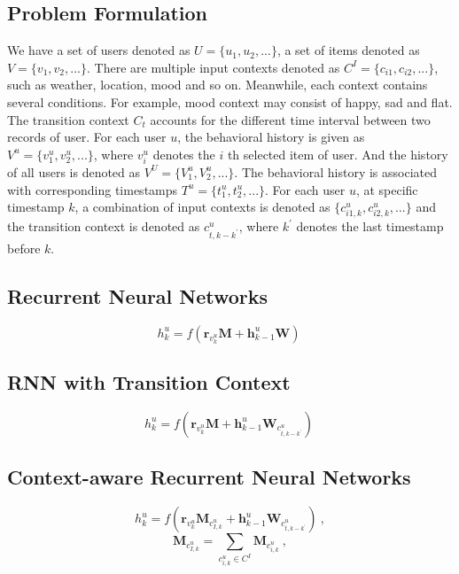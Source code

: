 \documentclass{sig-alternate}
\begin{document}
\subsection{Problem Formulation}
We have a set of users denoted as $U  = \{ u_1 ,u_2 ,...\}$, a set of items denoted as $V  = \{ v_1 ,v_2 ,...\}$. There are multiple input contexts denoted as $C^I = \{c_{i1} ,c_{i2} ,...\}$, such as weather, location, mood and so on. Meanwhile, each context contains several conditions. For example, mood context may consist of happy, sad and flat. The transition context $C_t$ accounts for the different time interval between two records of user. For each user $u$, the behavioral history is given as $V^u = \{v^u_{1}, v^u_{2}, ...\}$, where $v^u_{i}$ denotes the $i$ th selected item of user. And the history of all users is denoted as $V^U = \{V^u_{1}, V^u_{2}, ...\}$. The behavioral history is associated with corresponding timestamps $T^u = \{t^u_{1}, t^u_{2}, ...\}$. For each user $u$, at specific timestamp $k$, a combination of input contexts is denoted as $\{
c_{i1,k}^{u},c_{i2,k}^{u},...\}$ and the transition context is denoted as $c_{t,k-k^{'}}^{u}$, where $k^{'}$ denotes the last timestamp before $k$.
\subsection{ Recurrent Neural Networks}
\begin{equation}
h_{k}^{u}=f\left ( \textbf{r}_{v_{k}^{u}}\textbf{M}+\textbf{h}_{k-1}^{u}\textbf{W} \right )~
\end{equation}

\subsection{ RNN with Transition Context}
\begin{equation}
h_{k}^{u}=f\left ( \textbf{r}_{v_{k}^{u}}\textbf{M}+\textbf{h}_{k-1}^{u}\textbf{W}_{c_{t,k-k^{'}}^{u}} \right )
~\end{equation}
\subsection{ Context-aware Recurrent Neural Networks}
\begin{equation}
h_{k}^{u}=f\left ( \textbf{r}_{v_{k}^{u}}\textbf{M}_{c_{I,k}^{u}}+\textbf{h}_{k-1}^{u}\textbf{W}_{c_{t,k-k^{'}}^{u}} \right )
~,
\end{equation}
\begin{equation}
\textbf{M}_{c_{I,k}^{u}} = \sum_{c_{i,k}^{u}\in C^I} \textbf{M}_{c_{i,k}^{u}} 
~,
\end{equation}
\end{document}
